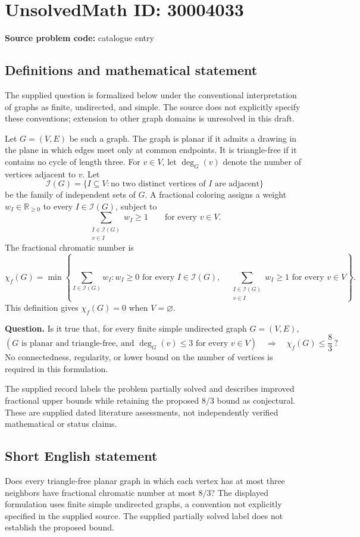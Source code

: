 \documentclass[11pt]{article}
\newcommand{\R}{\mathbb{R}}
\begin{document}
\section*{UnsolvedMath ID: 30004033}
\textbf{Source problem code:} catalogue entry
\subsection{Definitions and mathematical statement}
The supplied question is formalized below under the conventional interpretation of graphs as finite, undirected, and simple. The source does not explicitly specify these conventions; extension to other graph domains is unresolved in this draft.

Let \(G=(V,E)\) be such a graph. The graph is planar if it admits a drawing in the plane in which edges meet only at common endpoints. It is triangle-free if it contains no cycle of length three. For \(v\in V\), let \(\deg_G(v)\) denote the number of vertices adjacent to \(v\). Let
\[
\mathcal I(G)=\{I\subseteq V: \text{no two distinct vertices of }I\text{ are adjacent}\}
\]
be the family of independent sets of \(G\). A fractional coloring assigns a weight \(w_I\in\R_{\geq 0}\) to every \(I\in\mathcal I(G)\), subject to
\[
\sum_{\substack{I\in\mathcal I(G)\\v\in I}} w_I\geq 1
\qquad\text{for every }v\in V.
\]
The fractional chromatic number is
\[
\chi_f(G)=\min\left\{\sum_{I\in\mathcal I(G)}w_I:
 w_I\geq 0\text{ for every }I\in\mathcal I(G),\quad
 \sum_{\substack{I\in\mathcal I(G)\\v\in I}}w_I\geq 1\text{ for every }v\in V\right\}.
\]
This definition gives \(\chi_f(G)=0\) when \(V=\varnothing\).

\textbf{Question.} Is it true that, for every finite simple undirected graph \(G=(V,E)\),
\[
\left(G\text{ is planar and triangle-free, and }
\deg_G(v)\leq 3\text{ for every }v\in V\right)
\quad\Longrightarrow\quad
\chi_f(G)\leq\frac{8}{3}\,?
\]
No connectedness, regularity, or lower bound on the number of vertices is required in this formulation.

The supplied record labels the problem partially solved and describes improved fractional upper bounds while retaining the proposed \(8/3\) bound as conjectural. These are supplied dated literature assessments, not independently verified mathematical or status claims.
\subsection{Short English statement}
Does every triangle-free planar graph in which each vertex has at most three neighbors have fractional chromatic number at most \(8/3\)? The displayed formulation uses finite simple undirected graphs, a convention not explicitly specified in the supplied source. The supplied partially solved label does not establish the proposed bound.
\end{document}
